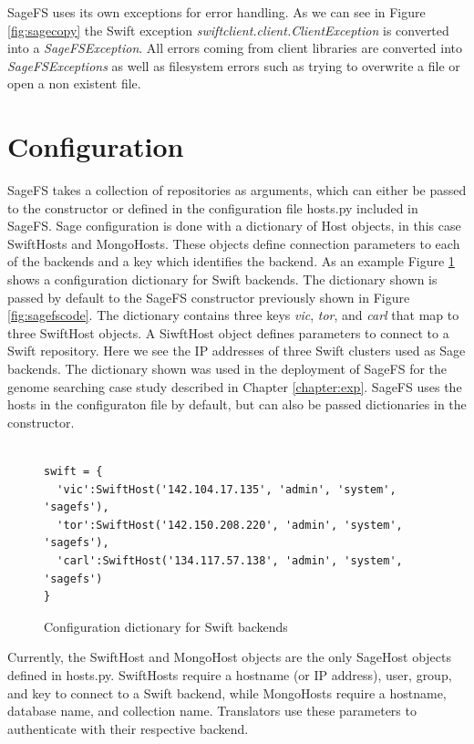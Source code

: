 SageFS uses its own exceptions for error handling. As we can see in Figure \ref{fig:sagecopy} the Swift exception \textit{swiftclient.client.ClientException} is converted into a \textit{SageFSException}. All errors coming from client libraries are converted into \textit{SageFSExceptions} as well as filesystem errors such as trying to overwrite a file or open a non existent file.


\section{Configuration}
\label{sec:config}

SageFS takes a collection of repositories as arguments, which can either be passed to the constructor or defined in the configuration file hosts.py included in SageFS. Sage configuration is done with a dictionary of Host objects, in this case SwiftHosts and MongoHosts. These objects define connection parameters to each of the backends and a key which identifies the backend. As an example Figure \ref{fig:swiftconfig} shows a configuration dictionary for Swift backends. The dictionary shown is passed by default to the SageFS constructor previously shown in Figure \ref{fig:sagefscode}. The dictionary contains three keys \textit{vic}, \textit{tor}, and \textit{carl} that map to three SwiftHost objects. A SiwftHost object defines parameters to connect to a Swift repository. Here we see the IP addresses of three Swift clusters used as Sage backends. The dictionary shown was used in the deployment of SageFS for the genome searching case study described in Chapter \ref{chapter:exp}. SageFS uses the hosts in the configuraton file by default, but can also be passed dictionaries in the constructor.

\begin{figure}[h]
\begin{lstlisting}

swift = {
  'vic':SwiftHost('142.104.17.135', 'admin', 'system', 'sagefs'),
  'tor':SwiftHost('142.150.208.220', 'admin', 'system', 'sagefs'),
  'carl':SwiftHost('134.117.57.138', 'admin', 'system', 'sagefs')
}

\end{lstlisting}
\caption{Configuration dictionary for Swift backends}
\label{fig:swiftconfig}
\end{figure}

Currently, the SwiftHost and MongoHost objects are the only SageHost objects defined in hosts.py. SwiftHosts require a hostname (or IP address), user, group, and key to connect to a Swift backend, while MongoHosts require a hostname, database name, and collection name. Translators use these parameters to authenticate with their respective backend.

